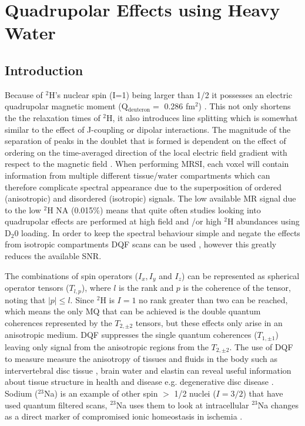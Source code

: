 \chapter{Quadrupolar Effects using Heavy Water}
\label{Chap:Quad}

\section{Introduction}

Because of $^2$H's nuclear spin (I=1) being larger than 1/2 it possesses an electric quadrupolar magnetic moment (Q$_{\text{deuteron}}=$ 0.286 fm$^2$)  \cite{Stone2015NuclearData}. This not only shortens the the relaxation times of $^2$H, it also introduces line splitting which is somewhat similar to the effect of J-coupling or dipolar interactions. The magnitude of the separation of peaks in the doublet that is formed is dependent on the effect of ordering on the time-averaged direction of the local electric field gradient with respect to the magnetic field \cite{Seelig1977DeuteriumMembranes, Eliav2016MultipleMRS}. When performing \ac{MRSI}, each voxel will contain information from multiple different tissue/water compartments which can therefore complicate spectral appearance due to the superposition of ordered (anisotropic) and disordered (isotropic) signals. The low available MR signal due to the low $^2$H \ac{NA} (0.015\%) means that quite often studies looking into quadrupolar effects are performed at high field  \cite{Gursan2022ResidualMuscle} and \cite{Ooms2015DoubleTissue}/or \cite{Damion2022DoubleLoading} high $^2$H abundances using D$_2$0 loading. In order to keep the spectral behaviour simple and negate the effects from isotropic compartments \ac{DQF} scans can be used \cite{Sharf1995DetectionNMR-Spectroscopy, Perea20072HDisc}, however this greatly reduces the available \ac{SNR}. 

The combinations of spin operators ($I_x, I_y$ and $I_z$) can be represented as spherical operator tensors ($T_{l,p}$), where $l$ is the rank and $p$ is the coherence of the tensor, noting that $|p| \le l$. Since $^2$H is $I=1$ no rank greater than two can be reached, which means the only \ac{MQ} that can be achieved is the double quantum coherences represented by the $T_{2,\pm2}$ tensors, but these effects only arise in an anisotropic medium. \ac{DQF} suppresses the single quantum coherences ($T_{1,\pm1}$) leaving only signal from the anisotropic regions from the $T_{2,\pm2}$. The use of \ac{DQF} to measure measure the anisotropy of tissues and fluids in the body such as intervertebral disc tissue  \cite{Ooms2015DoubleTissue}, brain water \cite{Assaf1997InSpectroscopy} and elastin \cite{Sun2010InvestigationNMR} can reveal useful information about tissue structure in health and disease e.g. degenerative disc disease \cite{Ooms2015DoubleTissue}. Sodium ($^{23}$Na) is an example of other spin $>$ 1/2 nuclei ($I=3/2$) that have used quantum filtered scans, $^{23}$Na uses them to look at intracellular $^{23}$Na changes as a direct marker of compromised ionic homeostasis in ischemia \cite{Tsang2012Triple-quantum-filteredT}.

